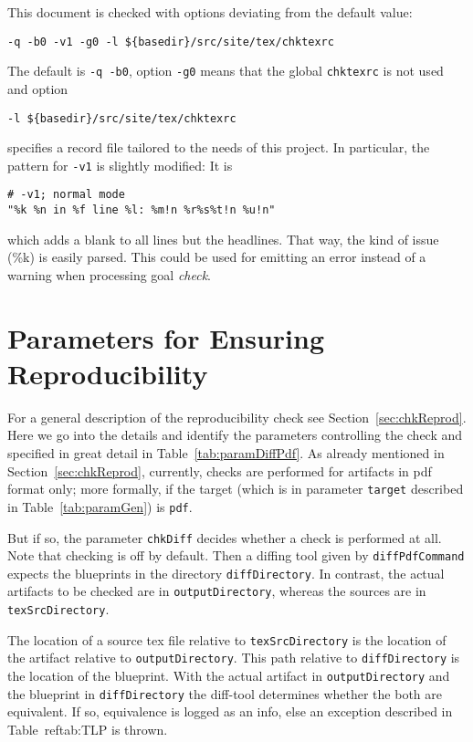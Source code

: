 This document is checked with options deviating from the default value: 
%
\begin{verbatim}
-q -b0 -v1 -g0 -l ${basedir}/src/site/tex/chktexrc
\end{verbatim}
%
The default is \texttt{-q -b0}, 
option \texttt{-g0} means that the global \texttt{chktexrc} is not used 
and option 
%
\begin{verbatim}
-l ${basedir}/src/site/tex/chktexrc
\end{verbatim}
%
specifies a record file tailored to the needs of this project. 
In particular, the pattern for \texttt{-v1} is slightly modified: 
It is 
%
\begin{verbatim}
# -v1; normal mode
"%k %n in %f line %l: %m!n %r%s%t!n %u!n"
\end{verbatim}
%
which adds a blank to all lines but the headlines. 
That way, the kind of issue (\%k) is easily parsed. 
This could be used for emitting an error instead of a warning 
when processing goal {\em check}. 


\section{Parameters for Ensuring Reproducibility}\label{sec:paramRepro}



For a general description of the reproducibility check 
see Section~\ref{sec:chkReprod}. 
Here we go into the details and identify the parameters 
controlling the check 
and specified in great detail in Table~\ref{tab:paramDiffPdf}. 
As already mentioned in Section~\ref{sec:chkReprod}, 
currently, checks are performed for artifacts in pdf format only; 
more formally, if the target 
(which is in parameter \texttt{target} described in Table~\ref{tab:paramGen}) 
is \texttt{pdf}. 

But if so, the parameter \texttt{chkDiff} 
decides whether a check is performed at all. 
Note that checking is off by default. 
Then a diffing tool given by \texttt{diffPdfCommand} 
expects the blueprints in the directory \texttt{diffDirectory}. 
In contrast, the actual artifacts to be checked are in \texttt{outputDirectory}, 
whereas the sources are in \texttt{texSrcDirectory}. 

The location of a source tex file relative to \texttt{texSrcDirectory} 
is the location of the artifact relative to \texttt{outputDirectory}. 
This path relative to \texttt{diffDirectory} is the location of the blueprint. 
With the actual artifact in \texttt{outputDirectory} 
and the blueprint in \texttt{diffDirectory} 
the diff-tool determines whether the both are equivalent. 
If so, equivalence is logged as an info, 
else an exception described in Table~ref{tab:TLP} is thrown. 

